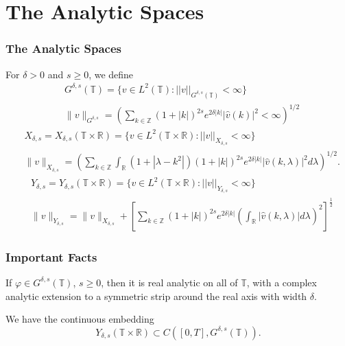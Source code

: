 \documentclass{beamer}
\numberwithin{equation}{section}
\newcommand{\ci}{\mathbb{T}}
\newcommand{\vp}{\varphi}
\begin{document}
\section{The Analytic Spaces}
\begin{frame}
  \frametitle{The Analytic Spaces}
For $\delta >0$ and $s\ge 0$, we define 
\pause
%
%
\begin{align*}
 & G^{\delta,s}(\mathbb{T})=\{v\in L^2(\mathbb{T}):
 ||v||_{G^{\delta,s}(\mathbb{T})}< \infty \}
 \\
 & \| v \|_{G^{\delta,s}}
 =\left( \sum_{k\in \mathbb{Z}} 
 (1+ |k|)^{2s}e^{2\delta|k|}|\widehat{v}(k)|^2<\infty\right)^{1/2}
 \end{align*}
%
%
\pause
\begin{align*}
  & X_{\delta,s}=X_{\delta,s}(\mathbb{T}\times \mathbb{R})=\{v\in L^2(\mathbb{T}\times \mathbb{R}):
||v||_{X_{\delta,s}}<\infty\}
\\
& \| v \|_{X_{\delta,s}}
=\left( \sum_{k\in \mathbb{Z}}\int_{\mathbb{R}}(1+|\lambda
-k^2|)(1+|k|)^{2s}
e^{2\delta |k|}|\widehat{v}(k,\lambda)|^2d\lambda\right)^{1/2}.
\end{align*}
%
\pause
%
\begin{align*}
& Y_{\delta,s}=Y_{\delta,s}(\mathbb{T}\times \mathbb{R})=\{v\in L^2(\mathbb{T}\times \mathbb{R}):
||v||_{Y_{\delta,s}}<\infty\}
\\
& \| v \|_{Y_{\delta,s}}
= \|v \|_{X_{\delta,s}}
+\left [\sum_{k\in \mathbb{Z}}(1+|k|)^{2s}e^{2\delta |k|}
\left (\int_{\mathbb{R}}
|\widehat{v}(k,\lambda)|d\lambda \right)^2 \right]^{\frac{1}{2}} 
\end{align*}
%
\end{frame}
%
%
\begin{frame}
  \frametitle{Important Facts}
      \begin{lemma}
    If $\vp \in G^{\delta,s}(\ci)$, $s \ge 0$,
      then it is real analytic on all of $\ci$, with a complex
  analytic extension to a symmetric strip around the real axis with width $\delta$.
\end{lemma}
  \begin{lemma}We have the continuous embedding
$$Y_{\delta,s}(\mathbb{T}\times \mathbb{R})
\subset C([0,T],G^{\delta,s}(\mathbb{T})).$$
\end{lemma}
\end{frame}
%
%
\end{document}
